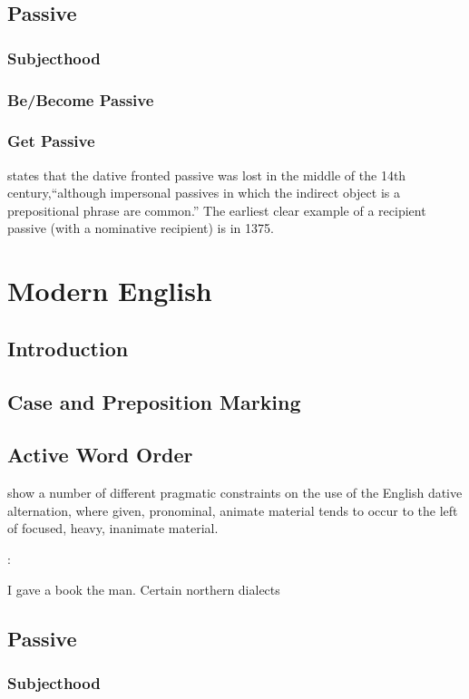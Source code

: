 \subsection{Passive}
\subsubsection{Subjecthood}
\subsubsection{Be/Become Passive}
\subsubsection{Get Passive}
\cite[383-385]{Allen.1999} states that the dative fronted passive was lost in the middle of the 14th century,``although impersonal passives in which the indirect object is a prepositional phrase are common.'' The earliest clear example of a recipient passive (with a nominative recipient) is in 1375.
\section{Modern English}
\subsection{Introduction}
\subsection{Case and Preposition Marking}
\subsection{Active Word Order}
\cite{Collins.1995,Bresnan.2007,Hollmann.2007,Bresnan.2009} show a number of different pragmatic constraints on the use of the English dative alternation, where given, pronominal, animate material tends to occur to the left of focused, heavy, inanimate material.

\cite{Gast.2007}:
\begin{exe}
\ex I gave a book the man. Certain northern dialects
\end{exe}
\subsection{Passive}
\subsubsection{Subjecthood}
